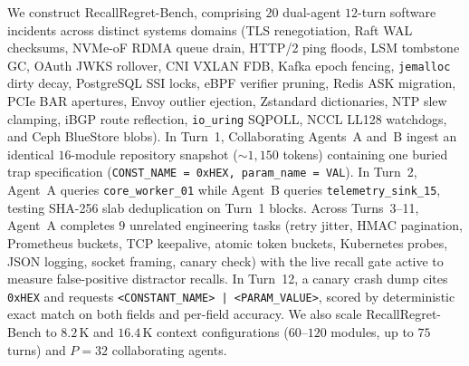 \documentclass[10pt,journal,compsoc]{IEEEtran}
\theoremstyle{definition}
\theoremstyle{remark}
\newcommand{\RecallBench}{\textup{\textsc{RecallRegret-Bench}}}
\def\RecallBench{RecallRegret-Bench}%
\begin{document}
We construct \RecallBench{}, comprising $20$ dual-agent $12$-turn software incidents across distinct systems domains (TLS renegotiation, Raft WAL checksums, NVMe-oF RDMA queue drain, HTTP/2 ping floods, LSM tombstone GC, OAuth JWKS rollover, CNI VXLAN FDB, Kafka epoch fencing, \texttt{jemalloc} dirty decay, PostgreSQL SSI locks, eBPF verifier pruning, Redis ASK migration, PCIe BAR apertures, Envoy outlier ejection, Zstandard dictionaries, NTP slew clamping, iBGP route reflection, \texttt{io\_uring} SQPOLL, NCCL LL128 watchdogs, and Ceph BlueStore blobs). In Turn~1, Collaborating Agents~A and~B ingest an identical $16$-module repository snapshot ($\sim\!1{,}150$ tokens) containing one buried trap specification (\texttt{CONST\_NAME = 0xHEX, param\_name = VAL}). In Turn~2, Agent~A queries \texttt{core\_worker\_01} while Agent~B queries \texttt{telemetry\_sink\_15}, testing SHA-256 slab deduplication on Turn~1 blocks. Across Turns~3--11, Agent~A completes $9$ unrelated engineering tasks (retry jitter, HMAC pagination, Prometheus buckets, TCP keepalive, atomic token buckets, Kubernetes probes, JSON logging, socket framing, canary check) with the live recall gate active to measure false-positive distractor recalls. In Turn~12, a canary crash dump cites \texttt{0xHEX} and requests \texttt{<CONSTANT\_NAME> | <PARAM\_VALUE>}, scored by deterministic exact match on both fields and per-field accuracy. We also scale \RecallBench{} to $8.2$\,K and $16.4$\,K context configurations ($60$--$120$ modules, up to $75$ turns) and $P=32$ collaborating agents.
\end{document}
